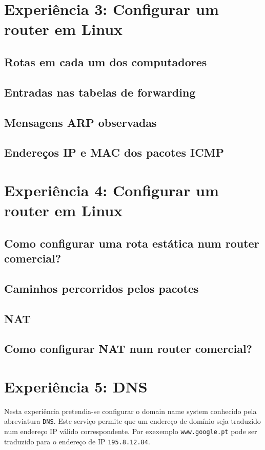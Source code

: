 \documentclass[a4paper,11pt,titlepage]{article}
\begin{document}
\section{Experiência 3: Configurar um router em Linux }

\subsection{Rotas em cada um dos computadores}

\subsection{Entradas nas tabelas de forwarding}

\subsection{Mensagens ARP observadas}

\subsection{Endereços IP e MAC dos pacotes ICMP}

\section{Experiência 4: Configurar um router em Linux }

\subsection{Como configurar uma rota estática num router comercial?}

\subsection{Caminhos percorridos pelos pacotes}

\subsection{NAT}

\subsection{Como configurar NAT num router comercial?}

\section{Experiência 5: DNS}
Nesta experiência pretendia-se configurar o domain name system conhecido pela abreviatura \texttt{DNS}. Este serviço permite que um endereço de domínio seja traduzido num endereço IP válido correspondente. Por exexemplo \texttt{www.google.pt} pode ser traduzido para o endereço de IP \texttt{195.8.12.84}.
\end{document}
